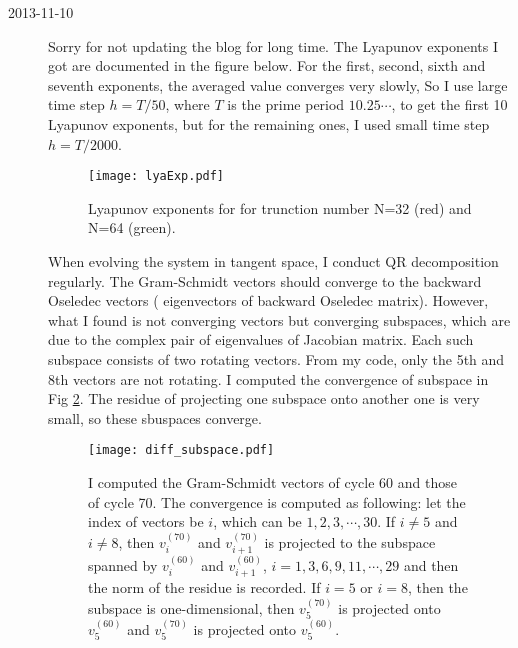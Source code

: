 \begin{description}
\item[2013-11-10 \XD]
Sorry for not updating the blog for long time. The Lyapunov exponents I got are documented in the figure below. For the first, second, sixth and seventh
exponents, the averaged value converges very slowly, So I use large time step $h=T/50$,
where $T$ is the prime period $10.25\cdots $, to get the first 10 Lyapunov exponents, but for the remaining
ones, I used small time step $h=T/2000$.

\begin{figure}[h]
 \centering
 \texttt{[image: lyaExp.pdf]}
 \caption{Lyapunov exponents for for trunction number N=32 (red) and N=64 (green).}
 \label{fig:lyaExp}
\end{figure}

When evolving the system in tangent space, I conduct QR decomposition regularly. The Gram-Schmidt vectors should
converge to the backward Oseledec vectors ( eigenvectors of backward Oseledec matrix). However, what I found is not
converging vectors but converging subspaces, which are due to the complex pair of eigenvalues of Jacobian matrix. Each such
subspace consists of two rotating vectors.  From my code, only the 5th and 8th vectors are not rotating.  I computed the convergence
of subspace in Fig \ref{fig:diff_subspace}. The residue of projecting one subspace onto another one is very small, so these
sbuspaces converge.

\begin{figure}[h]
 \centering
 \texttt{[image: diff\_subspace.pdf]}
 \caption{
 I computed the Gram-Schmidt vectors of cycle 60 and those of cycle 70.
 The convergence is computed as following: let the index of vectors be
 $i$, which can be $1,2,3, \cdots , 30$. If $i\neq 5  $ and $i\neq 8$,
 then $v_{i}^{(70)}$ and $v_{i+1}^{(70)}$  is projected to  the subspace
 spanned by $v_{i}^{(60)}$ and  $v_{i+1}^{(60)}$,  $ i=1,3,6,9,11,\cdots
 ,29$ and then the norm of the residue is recorded. If $i=5$ or $i=8$,
 then the subspace is one-dimensional, then $v_{5}^{(70)} $ is projected
 onto $v_{5}^{(60)} $ and $v_{5}^{(70)} $ is projected onto $v_{5}^{(60)}
 $.}
 \label{fig:diff_subspace}
\end{figure}


\end{description}
